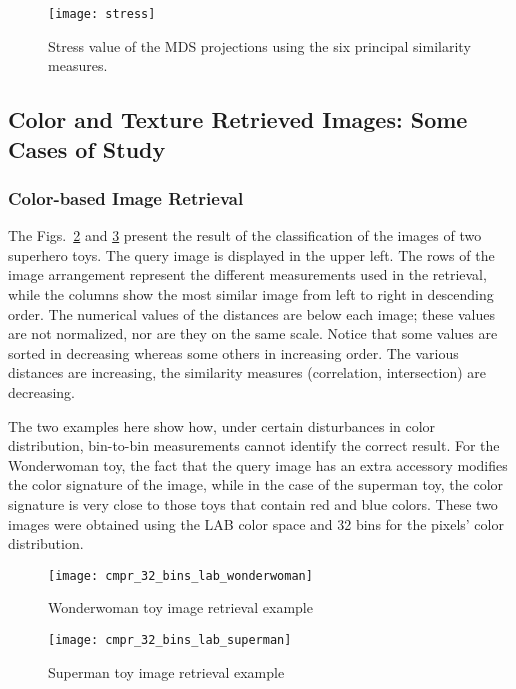 \begin{figure}[!ht]
    \centering
    \texttt{[image: stress]}
 \caption{Stress value of the MDS projections using the six principal similarity measures.}
 \label{fig:stress}
\end{figure}

\subsection{Color and Texture Retrieved Images: Some Cases of Study}\label{ch:suplementary_material_retrieval_systems}

\subsubsection{Color-based Image Retrieval}\label{sec:sm_color:class}
The Figs.\ \ref{fig:wonderwoman_distances} and \ref{fig:superman_distances} present the result of the classification of the images of two superhero toys. The query image is displayed in the upper left. The rows of the image arrangement represent the different measurements used in the retrieval, while the columns show the most similar image from left to right in descending order. The numerical values of the distances are below each image; these values are not normalized, nor are they on the same scale. Notice that some values are sorted in decreasing whereas some others in increasing order. The various distances are increasing, the similarity measures (correlation, intersection) are decreasing.

The two examples here show how, under certain disturbances in color distribution, bin-to-bin measurements cannot identify the correct result. For the Wonderwoman toy, the fact that the query image has an extra accessory modifies the color signature of the image, while in the case of the superman toy, the color signature is very close to those toys that contain red and blue colors. These two images were obtained using the LAB color space and 32 bins for the pixels' color distribution.
\begin{figure}[!ht]
 \centering    
 \texttt{[image: cmpr\_32\_bins\_lab\_wonderwoman]}
 \caption{Wonderwoman toy image retrieval example}
 \label{fig:wonderwoman_distances}
\end{figure}

\begin{figure}[!ht]
 \centering    
 \texttt{[image: cmpr\_32\_bins\_lab\_superman]}
 \caption{Superman toy image retrieval example}
 \label{fig:superman_distances}
\end{figure}

